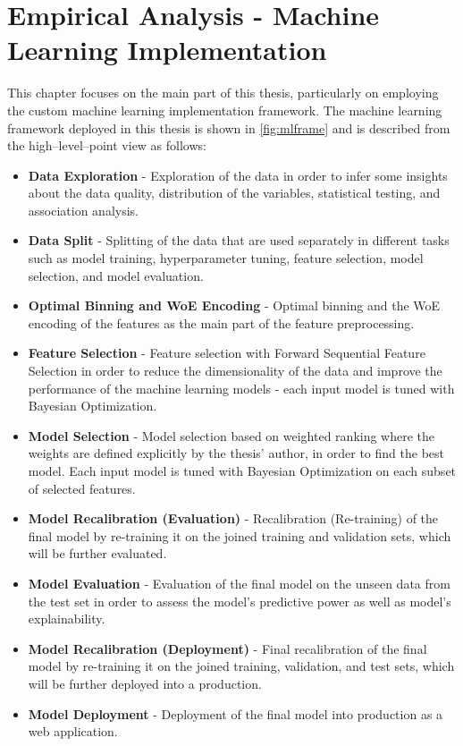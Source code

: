 \chapter{Empirical Analysis - Machine Learning Implementation}
\label{chap:four}
This chapter focuses on the main part of this thesis, particularly on employing the custom machine learning implementation framework. The machine learning framework deployed in this thesis is shown in \autoref{fig:mlframe} and is described from the high--level--point view as follows:
\begin{itemize}\setlength\itemsep{0em}
\item \textbf{Data Exploration} - Exploration of the data in order to infer some insights about the data quality, distribution of the variables, statistical testing, and association analysis.
\item \textbf{Data Split} - Splitting of the data that are used separately in different tasks such as model training, hyperparameter tuning, feature selection, model selection, and model evaluation.
\item \textbf{Optimal Binning and WoE Encoding} - Optimal binning and the WoE encoding of the features as the main part of the feature preprocessing.
\item \textbf{Feature Selection} - Feature selection with Forward Sequential Feature Selection in order to reduce the dimensionality of the data and improve the performance of the machine learning models - each input model is tuned with Bayesian Optimization.
\item \textbf{Model Selection} - Model selection based on weighted ranking where the weights are defined explicitly by the thesis' author, in order to find the best model. Each input model is tuned with Bayesian Optimization on each subset of selected features.
\item \textbf{Model Recalibration (Evaluation)} - Recalibration (Re-training) of the final model by re-training it on the joined training and validation sets, which will be further evaluated.
\item \textbf{Model Evaluation} - Evaluation of the final model on the unseen data from the test set in order to assess the model's predictive power as well as model's explainability.
\item \textbf{Model Recalibration (Deployment)} - Final recalibration of the final model by re-training it on the joined training, validation, and test sets, which will be further deployed into a production.
\item \textbf{Model Deployment} - Deployment of the final model into production as a web application.
\end{itemize}

